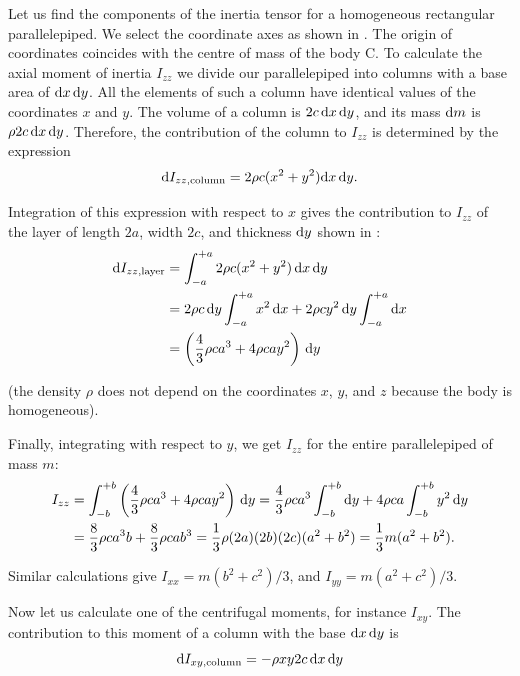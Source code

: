 Let us find the components of the inertia tensor for a homogeneous rectangular parallelepiped. We select the coordinate axes as shown in . The origin of coordinates coincides with the centre of mass of the body C. To calculate the axial moment of inertia $I_{zz}$ we divide our parallelepiped into columns with a base area of $\mathrm{d} x\,\mathrm{d} y$. All the elements of such a column have identical values of the coordinates $x$ and $y$. The volume of a column is $2c\,\mathrm{d} x\,\mathrm{d} y$, and its mass $\mathrm{d} m$ is $\rho 2c\,\mathrm{d} x\,\mathrm{d} y$. Therefore, the contribution of the column to $I_{zz}$ is determined by the expression
\begin{equation*}
\mathrm{d} I_{zz,\text{column}} = 2\rho c(x^2+y^2)\mathrm{d} x\,\mathrm{d} y.
\end{equation*}

\noindent
Integration of this expression with respect to $x$ gives the contribution to $I_{zz}$ of the layer of length $2a$, width $2c$, and thickness $\mathrm{d} y$ shown in :
\begin{align}
\mathrm{d} I_{zz,\text{layer}} &= \int_{-a}^{+a} 2\rho c(x^2+y^2)\,\mathrm{d} x\,\mathrm{d} y\nonumber\\
&= 2\rho c\,\mathrm{d} y\int_{-a}^{+a} x^2\,\mathrm{d} x + 2\rho cy^2\,\mathrm{d} y\int_{-a}^{+a}\mathrm{d} x \nonumber\\
&= \left(\frac{4}{3}\rho ca^3 + 4\rho cay^2\right)\,\mathrm{d} y\label{eq:5_42}
\end{align}

\noindent
(the density $\rho$ does not depend on the coordinates $x$, $y$, and $z$ because the body is homogeneous).

Finally, integrating  with respect to $y$, we get $I_{zz}$ for the entire parallelepiped of mass $m$:
\begin{align*}
I_{zz} &= \int_{-b}^{+b} \left(\frac{4}{3}\rho ca^3+4\rho cay^2\right)\,\mathrm{d} y = \frac{4}{3}\rho ca^3 \int_{-b}^{+b}\mathrm{d} y + 4\rho ca \int_{-b}^{+b} y^2 \,\mathrm{d} y\\
&= \frac{8}{3}\rho ca^3b + \frac{8}{3}\rho cab^3 = \frac{1}{3} \rho (2a)(2b)(2c)(a^2+b^2) = \frac{1}{3}m(a^2+b^2).
\end{align*}

\noindent
Similar calculations give $I_{xx}=m(b^2+c^2)/3$, and $I_{yy}=m(a^2+c^2)/3$.

Now let us calculate one of the centrifugal moments, for instance $I_{xy}$. The contribution to this moment of a column with the base $\mathrm{d} x\,\mathrm{d} y$ is
\begin{equation*}
\mathrm{d} I_{xy,\text{column}} = -\rho xy2c\,\mathrm{d} x\,\mathrm{d} y
\end{equation*}

